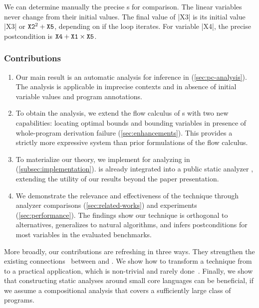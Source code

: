 We can determine manually the precise s for comparison. The
linear variables never change from their initial values. The final value of
\pr|X3| is its initial value \pr|X3| or \(\prm{X2}^2+\prm{X5}\), depending on if
the loop iterates. For variable \pr|X4|, the precise postcondition is
\(\prm{X4}+\prm{X1}\times\prm{X5}\).

\subsubsection{Contributions}
\label{subsec:contributions}

\begin{enumerate}

\item Our main result is an automatic analysis for  inference
in  (\autoref{sec:pc-analysis}). The analysis is applicable
in imprecise contexts and in absence of initial variable values and program
annotations.

\item To obtain the analysis, we extend the flow calculus of s
with two new capabilities: locating optimal bounds and bounding variables in
presence of whole-program derivation failure (\autoref{sec:enhancements}). This
provides a {strictly more expressive system} than prior formulations of the flow
calculus.

\item To materialize our theory, we implement \ndx{\impl} for analyzing
 in  (\autoref{subsec:implementation}). \ndx{\impl}
is already integrated into a public static analyzer , extending the
utility of our results beyond the paper presentation.

\item We demonstrate the relevance and effectiveness of the technique through
analyzer comparisons (\autoref{sec:related-works}) and experiments
(\autoref{sec:performance}). The findings show our technique is orthogonal to
alternatives, generalizes to natural algorithms, and infers postconditions for
most variables in the evaluated benchmarks.

\end{enumerate}

More broadly, our contributions are refreshing in three ways. They strengthen
the existing connections~\cite{nguyen2017,nguyen2014} {between}  and . We show how to transform a technique from
 to a practical application, which is non-trivial and
rarely done~\cite{moyen2017,aubert20222}. Finally, we show that constructing
static analyses around small core languages can be beneficial, if we assume a
{compositional} analysis that covers a sufficiently large class of programs.

